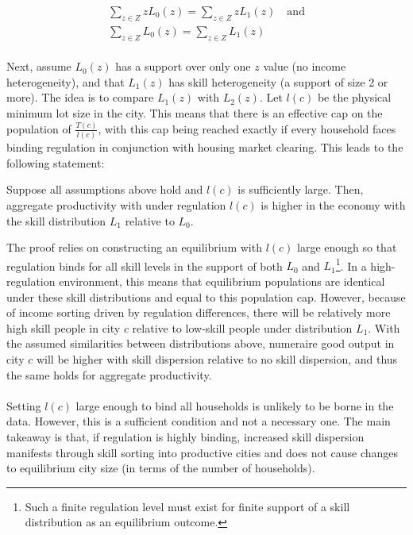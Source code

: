 \documentclass[12pt]{article}
\begin{document}
	\begin{eqnarray}
		\sum_{z \in Z}zL_{0}(z) = 	\sum_{z \in Z}zL_{1}(z) \quad \text{and} \\
		\sum_{z \in Z}L_{0}(z) = 	\sum_{z \in Z}L_{1}(z)
	\end{eqnarray}
	
	\paragraph*{}
	Next, assume $L_{0}(z)$ has a support over only one $z$ value (no income heterogeneity), and that $L_{1}(z)$ has skill heterogeneity (a support of size 2 or more). The idea is to compare $L_{1}(z)$ with $L_{2}(z)$. Let $l(c)$ be the physical minimum lot size in the city. This means that there is an effective cap on the population of $\frac{T(c)}{l(c)}$, with this cap being reached exactly if every household faces binding regulation in conjunction with housing market clearing. This leads to the following statement:
	
	\begin{Lemma}
		Suppose all assumptions above hold and $l(c)$ is sufficiently large. Then, aggregate productivity with under regulation $l(c)$ is higher in the economy with the skill distribution $L_{1}$ relative to $L_{0}$. 
	\end{Lemma}
	
	The proof relies on constructing an equilibrium with $l(c)$ large enough so that regulation binds for all skill levels in the support of both $L_{0}$ and $L_{1}$\footnote{Such a finite regulation level must exist for finite support of a skill distribution as an equilibrium outcome. }. In a high-regulation environment, this means that equilibrium populations are identical under these skill distributions and equal to this population cap. However, because of income sorting driven by regulation differences, there will be relatively more high skill people in city $c$ relative to low-skill people under distribution $L_{1}$. With the assumed similarities between distributions above, numeraire good output in city $c$ will be higher with skill dispersion relative to no skill dispersion, and thus the same holds for aggregate productivity. 
		
	\paragraph*{}
	Setting $l(c)$ large enough to bind all households is unlikely to be borne in the data. However, this is a sufficient condition and not a necessary one. The main takeaway is that, if regulation is highly binding, increased skill dispersion manifests through skill sorting into productive cities and does not cause changes to equilibrium city size (in terms of the number of households). 
	
\end{document}
